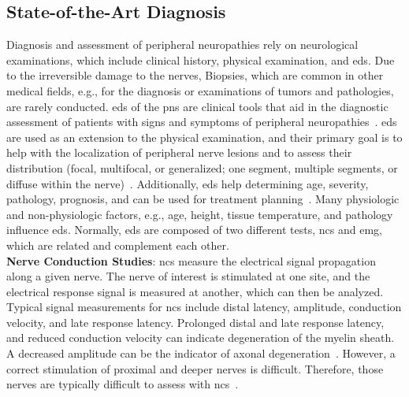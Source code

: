 \subsection{State-of-the-Art Diagnosis}
Diagnosis and assessment of peripheral neuropathies rely on neurological examinations, which include clinical history, physical examination, and \gls{eds}. Due to the irreversible damage to the nerves, Biopsies, which are common in other medical fields, e.g., for the diagnosis or examinations of tumors and pathologies, are rarely conducted. \gls{eds} of the \gls{pns} are clinical tools that aid in the diagnostic assessment of patients with signs and symptoms of peripheral neuropathies~\cite{Mohassel2015}. \gls{eds} are used as an extension to the physical examination, and their primary goal is to help with the localization of peripheral nerve lesions and to assess their distribution (focal, multifocal, or generalized; one segment, multiple segments, or diffuse within the nerve)~\cite{Mohassel2015}. Additionally, \gls{eds} help determining age, severity, pathology, prognosis, and can be used for treatment planning~\cite{Mohassel2015}. Many physiologic and non-physiologic factors, e.g., age, height, tissue temperature, and pathology influence \gls{eds}. Normally, \gls{eds} are composed of two different tests, \gls{ncs} and \gls{emg}, which are related and complement each other.\\

\textbf{Nerve Conduction Studies}: \gls{ncs} measure the electrical signal propagation along a given nerve. The nerve of interest is stimulated at one site, and the electrical response signal is measured at another, which can then be analyzed. Typical signal measurements for \gls{ncs} include distal latency, amplitude, conduction velocity, and late response latency. Prolonged distal and late response latency, and reduced conduction velocity can indicate degeneration of the myelin sheath. A decreased amplitude can be the indicator of axonal degeneration~\cite{Mohassel2015}. However, a correct stimulation of proximal and deeper nerves is difficult. Therefore, those nerves are typically difficult to assess with \gls{ncs}~\cite{Mohassel2015}. \\

